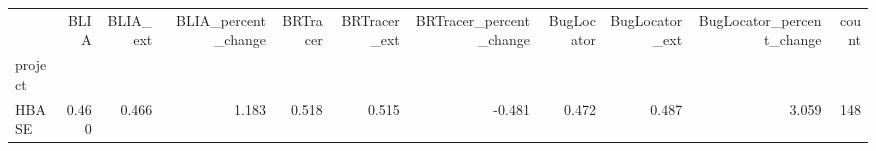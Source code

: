 \begin{tabular}{lrrrrrrrrrr}
\toprule
{} &  BLIA &  BLIA\_ext &  BLIA\_percent\_change &  BRTracer &  BRTracer\_ext &  BRTracer\_percent\_change &  BugLocator &  BugLocator\_ext &  BugLocator\_percent\_change &  count \\
project &       &           &                      &           &               &                          &             &                 &                            &        \\
\midrule
HBASE   & 0.460 &     0.466 &                1.183 &     0.518 &         0.515 &                   -0.481 &       0.472 &           0.487 &                      3.059 &    148 \\
\bottomrule
\end{tabular}
